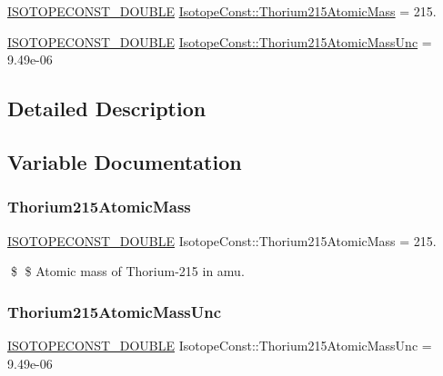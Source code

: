 \begin{DoxyCompactItemize}
\item 
\mbox{\hyperlink{group___isotope_const-_macros_ga8f45a7272ce02c0b4c65c44636ed719a}{I\+S\+O\+T\+O\+P\+E\+C\+O\+N\+S\+T\+\_\+\+D\+O\+U\+B\+LE}} \mbox{\hyperlink{group___isotope_const-_thorium-_th215_ga577946b93e4e750871c1a401e5895a32}{Isotope\+Const\+::\+Thorium215\+Atomic\+Mass}} = 215.
\item 
\mbox{\hyperlink{group___isotope_const-_macros_ga8f45a7272ce02c0b4c65c44636ed719a}{I\+S\+O\+T\+O\+P\+E\+C\+O\+N\+S\+T\+\_\+\+D\+O\+U\+B\+LE}} \mbox{\hyperlink{group___isotope_const-_thorium-_th215_ga3a490e4464fae5ccc6b4782a13082789}{Isotope\+Const\+::\+Thorium215\+Atomic\+Mass\+Unc}} = 9.\+49e-\/06
\end{DoxyCompactItemize}


\subsection{Detailed Description}


\subsection{Variable Documentation}
\mbox{\label{group___isotope_const-_thorium-_th215_ga577946b93e4e750871c1a401e5895a32}} 
\subsubsection{\texorpdfstring{Thorium215\+Atomic\+Mass}{Thorium215AtomicMass}}
{\footnotesize\ttfamily \mbox{\hyperlink{group___isotope_const-_macros_ga8f45a7272ce02c0b4c65c44636ed719a}{I\+S\+O\+T\+O\+P\+E\+C\+O\+N\+S\+T\+\_\+\+D\+O\+U\+B\+LE}} Isotope\+Const\+::\+Thorium215\+Atomic\+Mass = 215.}

\$ \$ Atomic mass of Thorium-\/215 in amu. \mbox{\label{group___isotope_const-_thorium-_th215_ga3a490e4464fae5ccc6b4782a13082789}} 
\subsubsection{\texorpdfstring{Thorium215\+Atomic\+Mass\+Unc}{Thorium215AtomicMassUnc}}
{\footnotesize\ttfamily \mbox{\hyperlink{group___isotope_const-_macros_ga8f45a7272ce02c0b4c65c44636ed719a}{I\+S\+O\+T\+O\+P\+E\+C\+O\+N\+S\+T\+\_\+\+D\+O\+U\+B\+LE}} Isotope\+Const\+::\+Thorium215\+Atomic\+Mass\+Unc = 9.\+49e-\/06}

